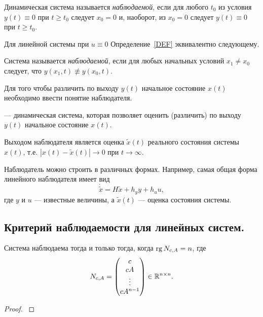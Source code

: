 \documentclass[../../TAU.tex]{subfiles}
\begin{document}
    \begin{defi}\label{DEF}
        Динамическая система  называется \textit{наблюдаемой}, если для любого $t_0$ из условия $y(t)\equiv 0$ при $t\ge t_0$ следует $x_0 = 0$ и, наоборот, из $x_0=0$ следует $y(t)\equiv0$ при $t\ge t_0$.
    \end{defi}

    Для линейной системы  при $u\equiv0$ Определение~\ref{DEF} эквивалентно следующему.
    
    \begin{defi}
        Система  называется \textit{наблюдаемой}, если для любых начальных условий $x_1\neq x_0$ следует, что $y(x_1, t)\not\equiv y(x_0, t)$.
    \end{defi}

    Для того чтобы различить по выходу $y(t)$ начальное состояние $x(t)$ необходимо ввести понятие наблюдателя.

     --- динамическая система, которая позволяет оценить (различить) по выходу $y(t)$ начальное состояние $x(t)$.

    Выходом наблюдателя является оценка $\tilde x(t)$ реального состояния системы $x(t)$, т.е. $|x(t)-\tilde x(t)|\rightarrow 0$ при $t\rightarrow\infty$.

    Наблюдатель можно строить в различных формах. Например, самая общая форма линейного наблюдателя имеет вид
    $$
    \dot{\tilde x} = H\tilde x + h_y y + h_u u,
    $$
    где $y$ и $u$ --- известные величины, а $\tilde x (t)$ --- оценка состояния системы.

\subsection{Критерий наблюдаемости для линейных систем.}

    \begin{theor}
        Система  наблюдаема тогда и только тогда, когда $\mathop{\mathrm{rg}}\nolimits N_{c,A} = n$, где
        $$
            N_{c,A} =
            \begin{pmatrix}
                c\\
                cA\\
                \vdots\\
                cA^{n-1}
            \end{pmatrix}
            \in\mathbb{R}^{n\times n}.
        $$
    \end{theor}
    
    \begin{proof}
    \cite[стр. 315-318]{voron2}
    \end{proof}
\end{document}
